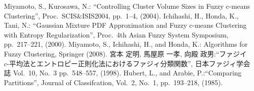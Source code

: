 \documentclass[twocolumn, a4paper]{icethesisabst}
\begin{document}
\begin{thebibliography}{5}
Miyamoto, S., Kurosawa, N.: ``Controlling Cluster Volume Sizes in Fuzzy c-means Clustering'', Proc.~SCIS\&ISIS2004, pp.~1--4, (2004).
Ichihashi, H., Honda, K., Tani, N.: ``Gaussian Mixture PDF Approximation and Fuzzy c-means Clustering with Entropy Regularization'', Proc.~4th Asian Fuzzy System Symposium, pp.~217--221, (2000).
Miyamoto, S., Ichihashi, H., and Honda, K.: Algorithms for Fuzzy Clustering, Springer (2008).
宮本 定明, 馬屋原 一孝, 向殿 政男:``ファジイ $c$-平均法とエントロピー正則化法におけるファジィ分類関数'', 日本ファジィ学会誌 Vol.~10, No.~3  pp.~548--557, (1998).
 Hubert, L., and Arabie, P.:``Comparing Partitions'', Journal of Classifcation, Vol.~2, No.~1, pp.~193--218, (1985).
\end{thebibliography}
\end{document}
